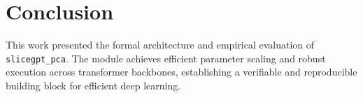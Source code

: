 \section{Conclusion}
This work presented the formal architecture and empirical evaluation of \texttt{slicegpt_pca}. The module achieves efficient parameter scaling and robust execution across transformer backbones, establishing a verifiable and reproducible building block for efficient deep learning.
